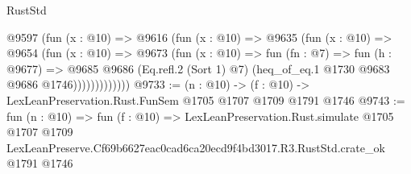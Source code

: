 \begin{lexlean}{RustStd}
\begin{coremodule}
                @9597
                  (fun (x : @10) =>
                  @9616
                    (fun (x : @10) =>
                    @9635
                      (fun (x : @10) =>
                      @9654
                        (fun (x : @10) =>
                        @9673
                          (fun (x : @10) =>
                          fun (fn : @7) =>
                          fun (h : @9677) =>
                          @9685
                            @9686
                            (Eq.refl.{2} (Sort 1) @7)
                            (heq_of_eq.{1} @1730 @9683 @9686 @1746)))))))))))))
@9733 := (n : @10) -> (f : @10) -> LexLeanPreservation.Rust.FunSem @1705 @1707 @1709 @1791 @1746
@9743 := fun (n : @10) =>
  fun (f : @10) =>
  LexLeanPreservation.Rust.simulate
    @1705
    @1707
    @1709
    LexLeanPreserve.Cf69b6627eac0cad6ca20ecd9f4bd3017.R3.RustStd.crate_ok
    @1791
    @1746
\end{coremodule}
\end{lexlean}

